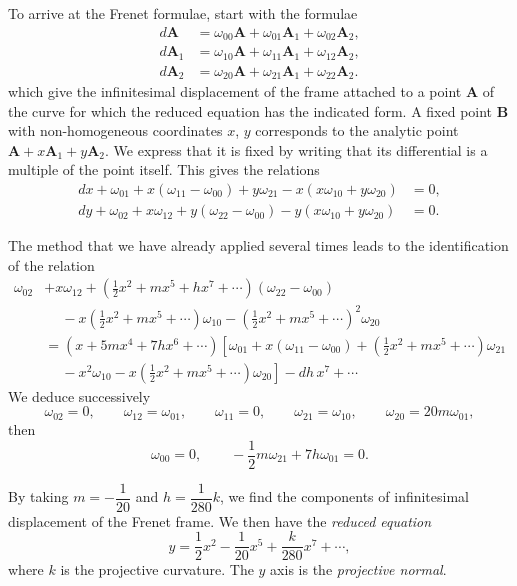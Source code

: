 To arrive at the Frenet formulae, start with the formulae
\begin{align*}
  d\mathbf{A}_{\phantom{0}}&=\omega_{00}\mathbf{A}+\omega_{01}\mathbf{A}_{1}+\omega_{02}\mathbf{A}_{2},\\
  d\mathbf{A}_{{1}}&=\omega_{10}\mathbf{A}+\omega_{11}\mathbf{A}_{1}+\omega_{12}\mathbf{A}_{2},\\
  d\mathbf{A}_{{2}}&=\omega_{20}\mathbf{A}+\omega_{21}\mathbf{A}_{1}+\omega_{22}\mathbf{A}_{2}.
\end{align*}
which give the infinitesimal displacement of the frame attached to a point $\mathbf{A}$ of the curve for which the reduced equation has the indicated form. A fixed point $\mathbf{B}$ with non-homogeneous coordinates $x$, $y$ corresponds to the analytic point $\mathbf{A}+x\mathbf{A}_{1}+y\mathbf{A}_{2}$. We express that it is fixed by writing that its differential is a multiple of the point itself. This gives the relations
\begin{align*}
  dx+\omega_{01}+x(\omega_{11}-\omega_{00})+y\omega_{21}-x(x\omega_{10}+y\omega_{20})&=0,\\
  dy+\omega_{02}+x \omega_{12}+y(\omega_{22}-\omega_{00})-y(x\omega_{10}+y\omega_{20})&=0.
\end{align*}

The method that we have already applied several times leads to the identification of the relation
\begin{align*}
  \omega_{02}&+ x\omega_{12}+\left(\frac{1}{2} x^{2}+mx^{5}+hx^{7}+\cdots\right)(\omega_{22}-\omega_{00})\\
  &\phantom{+}{}-{}x\left(\frac{1}{2}x^{2}+mx^{5}+\cdots\right)\omega_{10}-\left(\frac{1}{2}x^{2}+mx^{5}+\cdots\right)^{2}\omega_{20}\\
    &=(x+5mx^{4}+7hx^{6}+\cdots)\left[\omega_{01}+x(\omega_{11}-\omega_{00})+\left(\frac{1}{2}x^{2}+mx^{5}+\cdots\right)\omega_{21}\right.\\
    &\phantom{+}-\left. x^{2}\omega_{10}-x\left(\frac{1}{2}x^{2}+mx^{5}+\cdots\right)\omega_{20}\right]-dh\,x^{7}+\cdots
\end{align*}
We deduce successively
\[
\omega_{02}=0,\qquad\omega_{12}=\omega_{01},\qquad\omega_{11}=0,\qquad\omega_{21}=\omega_{10},\qquad\omega_{20}=20 m\omega_{01},
\]
then
\[
\omega_{00}=0,\qquad-\frac{1}{2}m\omega_{21}+7h\omega_{01}=0.
\]

By taking $m=-\dfrac{1}{20}$ and $h=\dfrac{1}{280}k$, we find the components of infinitesimal displacement of the Frenet frame. We then have the \emph{reduced equation}
\[
y=\frac{1}{2}x^{2}-\frac{1}{20} x^{5}+\frac{k}{280} x^{7}+\cdots,
\]
where $k$ is the projective curvature. The $y$ axis is the \emph{projective normal}.

